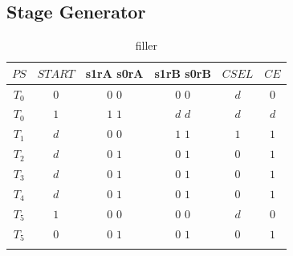 \documentclass[11pt,a4paper,english]{article}
\begin{document}
%
\pagebreak
 \subsection*{Stage Generator}
    \begin{table}[h!]
      \centering
      \caption{
          filler
          }
      
        \begin{tabular}{c|c|c|c|c|c}%
          \toprule%
          $ PS $             &        $START$            &        s1rA    s0rA           &        s1rB    s0rB      &          $CSEL$           &           $CE$                   \\
          \midrule%
              $T_0$            &          $0$              &          $0$       $0$        &        $0$      $0$      &          $d$            &           $0$                    \\ \hdashline%
              $T_0$            &          $1$              &          $1$       $1$        &        $d$      $d$      &          $d$            &           $d$                    \\ \hdashline%
              $T_1$            &          $d$              &          $0$       $0$        &        $1$      $1$      &          $1$            &           $1$                    \\ \hdashline%
              $T_2$            &          $d$              &          $0$       $1$        &        $0$      $1$      &          $0$            &           $1$                    \\ \hdashline%
              $T_3$            &          $d$              &          $0$       $1$        &        $0$      $1$      &          $0$            &           $1$                    \\ \hdashline%
              $T_4$            &          $d$              &          $0$       $1$        &        $0$      $1$      &          $0$            &           $1$                    \\ \hdashline%
              $T_5$            &          $1$              &          $0$       $0$        &        $0$      $0$      &          $d$            &           $0$                    \\ \hdashline%
              $T_5$            &          $0$              &          $0$       $1$        &        $0$      $1$      &          $0$            &           $1$                    \\ \hdashline%
        \end{tabular}
      \label{table:1}
    \end{table}
          
      
  \pagebreak

  \pagebreak
\end{document}
